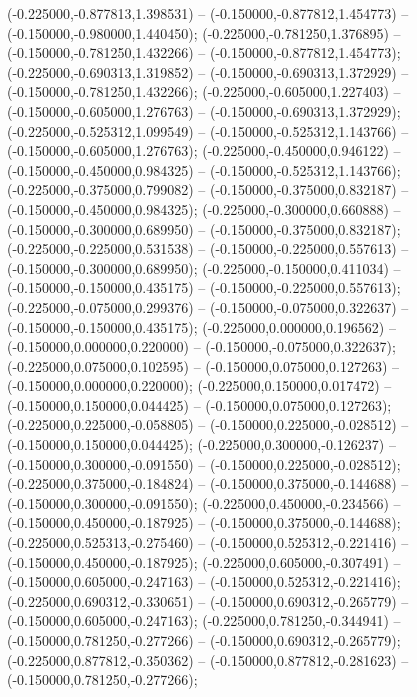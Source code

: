  (-0.225000,-0.877813,1.398531) -- (-0.150000,-0.877812,1.454773) -- (-0.150000,-0.980000,1.440450);
 (-0.225000,-0.781250,1.376895) -- (-0.150000,-0.781250,1.432266) -- (-0.150000,-0.877812,1.454773);
 (-0.225000,-0.690313,1.319852) -- (-0.150000,-0.690313,1.372929) -- (-0.150000,-0.781250,1.432266);
 (-0.225000,-0.605000,1.227403) -- (-0.150000,-0.605000,1.276763) -- (-0.150000,-0.690313,1.372929);
 (-0.225000,-0.525312,1.099549) -- (-0.150000,-0.525312,1.143766) -- (-0.150000,-0.605000,1.276763);
 (-0.225000,-0.450000,0.946122) -- (-0.150000,-0.450000,0.984325) -- (-0.150000,-0.525312,1.143766);
 (-0.225000,-0.375000,0.799082) -- (-0.150000,-0.375000,0.832187) -- (-0.150000,-0.450000,0.984325);
 (-0.225000,-0.300000,0.660888) -- (-0.150000,-0.300000,0.689950) -- (-0.150000,-0.375000,0.832187);
 (-0.225000,-0.225000,0.531538) -- (-0.150000,-0.225000,0.557613) -- (-0.150000,-0.300000,0.689950);
 (-0.225000,-0.150000,0.411034) -- (-0.150000,-0.150000,0.435175) -- (-0.150000,-0.225000,0.557613);
 (-0.225000,-0.075000,0.299376) -- (-0.150000,-0.075000,0.322637) -- (-0.150000,-0.150000,0.435175);
 (-0.225000,0.000000,0.196562) -- (-0.150000,0.000000,0.220000) -- (-0.150000,-0.075000,0.322637);
 (-0.225000,0.075000,0.102595) -- (-0.150000,0.075000,0.127263) -- (-0.150000,0.000000,0.220000);
 (-0.225000,0.150000,0.017472) -- (-0.150000,0.150000,0.044425) -- (-0.150000,0.075000,0.127263);
 (-0.225000,0.225000,-0.058805) -- (-0.150000,0.225000,-0.028512) -- (-0.150000,0.150000,0.044425);
 (-0.225000,0.300000,-0.126237) -- (-0.150000,0.300000,-0.091550) -- (-0.150000,0.225000,-0.028512);
 (-0.225000,0.375000,-0.184824) -- (-0.150000,0.375000,-0.144688) -- (-0.150000,0.300000,-0.091550);
 (-0.225000,0.450000,-0.234566) -- (-0.150000,0.450000,-0.187925) -- (-0.150000,0.375000,-0.144688);
 (-0.225000,0.525313,-0.275460) -- (-0.150000,0.525312,-0.221416) -- (-0.150000,0.450000,-0.187925);
 (-0.225000,0.605000,-0.307491) -- (-0.150000,0.605000,-0.247163) -- (-0.150000,0.525312,-0.221416);
 (-0.225000,0.690312,-0.330651) -- (-0.150000,0.690312,-0.265779) -- (-0.150000,0.605000,-0.247163);
 (-0.225000,0.781250,-0.344941) -- (-0.150000,0.781250,-0.277266) -- (-0.150000,0.690312,-0.265779);
 (-0.225000,0.877812,-0.350362) -- (-0.150000,0.877812,-0.281623) -- (-0.150000,0.781250,-0.277266);
